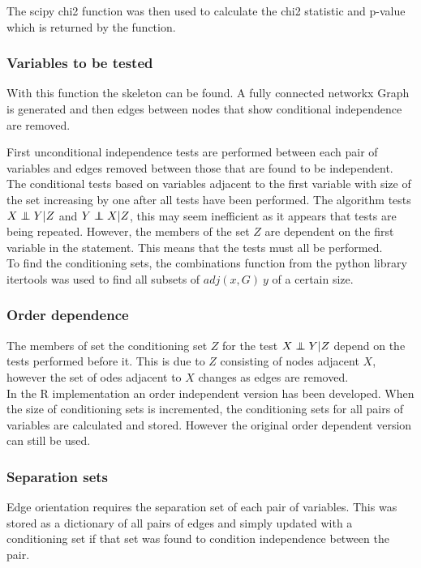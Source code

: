 \documentclass{article}
\newcommand\independent{\protect\mathpalette{\protect\independenT}{\perp}}
\def\independenT#1#2{\mathrel{\rlap{$#1#2$}\mkern2mu{#1#2}}}
\begin{document}
The scipy chi2 function was then used to calculate the chi2 statistic and p-value which is returned by the function.\\

\subsubsection{Variables to be tested}
With this function the skeleton can be found. A fully connected networkx Graph is generated and then edges between nodes that show conditional independence are removed. 

First unconditional independence tests are performed between each pair of variables and edges removed between those that are found to be independent. The conditional tests based on variables adjacent to the first variable with size of the set increasing by one after all tests have been performed. The algorithm tests $X \independent Y | Z$ and $Y \independent X | Z$, this may seem inefficient as it appears that tests are being repeated. However, the members of the set $Z$ are dependent on the first variable in the statement. This means that the tests must all be performed.\\

To find the conditioning sets, the combinations function from the python library itertools was used to find all subsets of $adj(x,G)\ y$ of a certain size.\\

\subsubsection{Order dependence}
The members of set the conditioning set $ Z $ for the test $X \independent Y|Z$ depend on the tests performed before it. This is due to $Z$ consisting of nodes adjacent $X$, however the set of odes adjacent to $X$ changes as edges are removed.\\

In the R implementation an order independent version has been developed. When the size of conditioning sets is incremented, the conditioning sets for all pairs of variables  are calculated and stored. However the original order dependent version can still be used.\\

\subsubsection{Separation sets}
Edge orientation requires the separation set of each pair of variables. This was stored as a dictionary of all pairs of edges and simply updated with a conditioning set if that set was found to condition independence between the pair.\\
\end{document}
